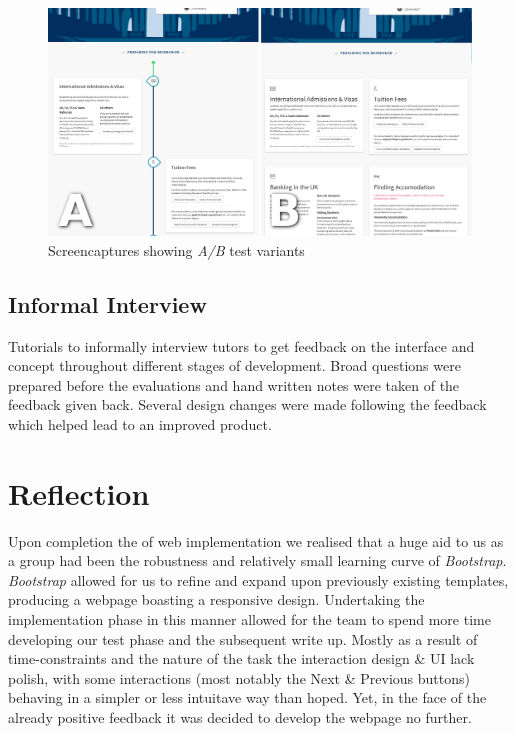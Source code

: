 \documentclass[a4paper, notoc]{tufte-handout}
\begin{document}
\begin{figure}
  \includegraphics{abtest.png}
  \caption{
    \label{fig:abtest}
    Screencaptures showing \textit{A/B} test variants
  }

\end{figure}

\subsection{Informal Interview}\label{subsec:interview}


Tutorials to informally interview tutors to get feedback on the interface and concept throughout different stages of development. Broad questions were prepared before the evaluations and hand written notes were taken of the feedback given back. Several design changes were made following the feedback which helped lead to an improved product.

\section{Reflection}


Upon completion the of web implementation we realised that a huge aid to us as a group had been the robustness and relatively small learning curve of \textit{Bootstrap}. \textit{Bootstrap} allowed for us to refine and expand upon previously existing templates, producing a webpage boasting a responsive design. Undertaking the implementation phase in this manner allowed for the team to spend more time developing our test phase and the subsequent write up. Mostly as a result of time-constraints and the nature of the task the interaction design \& UI lack polish, with some interactions (most notably the Next & Previous buttons) behaving in a simpler or less intuitave way than hoped. Yet, in the face of the already positive feedback it was decided to develop the webpage no further.
\end{document}
